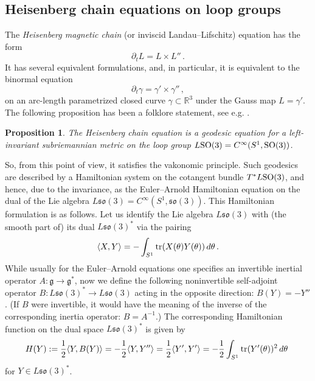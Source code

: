 \documentclass[11pt]{article}
\newtheorem{proposition}[lemma]{Proposition}
\theoremstyle{definition}
\newcounter{ai}
\begin{document}
\subsection{Heisenberg chain equations on loop groups}
\label{sec:heisenberg}

  The {\it Heisenberg magnetic chain} (or inviscid Landau--Lifschitz) equation has the form
 $$
 \partial_t L = L\times L''\,.
 $$   
It has several equivalent formulations, and, in particular, it is equivalent to the binormal equation 
    $$ 
   \partial_t \gamma =     \gamma'\times\gamma''\,, 
  $$ 
on an arc-length parametrized closed curve $\gamma\subset\mathbb R^3$ under the Gauss map $L=\gamma'$.
The following proposition has been a folklore statement, see e.g. \cite{AK}. 

\begin{proposition}
The Heisenberg chain equation is a geodesic equation for a left-invariant
  subriemannian metric on the loop group   $L{\rm SO}(3)=C^\infty(S^1,{\rm SO}(3))$. 
\end{proposition}

  So, from this point of view, it satisfies the vakonomic principle. 
  Such geodesics are described by a Hamiltonian 
  system on the cotangent bundle $T^*L{\rm SO}(3)$, and hence, due to the invariance, as the Euler--Arnold 
  Hamiltonian equation on  the dual of the Lie algebra   $L\mathfrak{so}(3)=C^\infty(S^1,\mathfrak{so}(3))$. 
  This Hamiltonian formulation  is as follows. Let us identify the Lie algebra 
  $L\mathfrak{so}(3)$ with (the smooth part of) its dual $L\mathfrak{so}(3)^*$   via the pairing 
  $$ 
    \langle X,Y\rangle =-\int_{S^1}{\rm tr}(X(\theta)Y(\theta))\, d\theta\,. 
  $$ 
  While usually for the Euler--Arnold equations one specifies an invertible inertial operator $A:\mathfrak{g}\to\mathfrak{g}^*$, now we define the following noninvertible   self-adjoint operator
  $B: L\mathfrak{so}(3)^*\to L\mathfrak{so}(3)$ acting in the opposite 
  direction: $ B(Y)=-Y''$. 
(If $B$ were invertible, it would have the meaning of the inverse of
the corresponding inertia operator: $B=A^{-1}$.)
  The corresponding Hamiltonian function on the dual space 
  $L\mathfrak{so}(3)^*$  is given by 
$$ 
H(Y):=\frac12 \langle Y,  B(Y)\rangle=-\frac12 \langle Y, Y''\rangle
                     =\frac12 \langle Y', Y'\rangle=-\frac12 \int_{S^1}{\rm tr}(Y'(\theta))^2\, d\theta\,\,
$$ 
for $Y\in L\mathfrak{so}(3)^*$.
\end{document}
